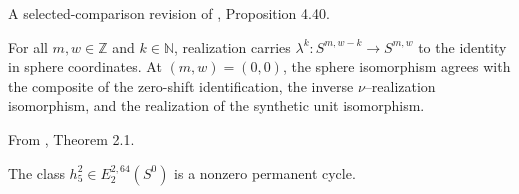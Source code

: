\begin{theorem}
\label{frontier:Literature:00344e96581e}
A selected-comparison revision of \cite{Pst}, Proposition 4.40.\par

For all $m,w\in\mathbb Z$ and $k\in\mathbb N$, realization carries $\lambda^k:S^{m,w-k}\to S^{m,w}$ to the identity in sphere coordinates. At $(m,w)=(0,0)$, the sphere isomorphism agrees with the composite of the zero-shift identification, the inverse $\nu$--realization isomorphism, and the realization of the synthetic unit isomorphism.
\end{theorem}

\begin{theorem}
\label{frontier:Literature:bc100fe38326}
From \cite{BJMtheta5}, Theorem 2.1.\par

The class $h_5^2\in E_2^{2,64}(S^0)$ is a nonzero permanent cycle.
\end{theorem}

